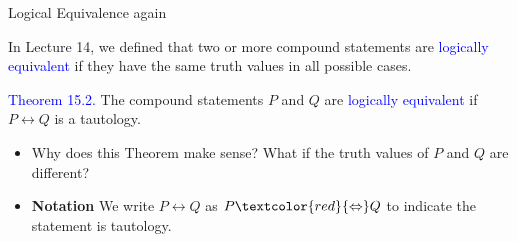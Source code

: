 \documentclass[aspectratio=169]{beamer}
\providecommand{\Blue}[1]{\textcolor{blue}{#1}}
\providecommand{\Red}[1]{\textcolor{red}{#1}}
\begin{document}
\begin{frame}[plain]{Logical Equivalence again}

In Lecture 14, we defined that two or more compound statements are  \Blue{logically equivalent}
if they have the same truth values in all possible cases.
\medskip

\Blue{Theorem 15.2.} The compound statements $P$ and $Q$ are  \Blue{logically equivalent} if
    $P \leftrightarrow Q$ is a tautology. 
    \begin{itemize}
      \item Why does this Theorem make sense? What if the truth values of $P$ and $Q$ are different?
      \pause 
      \item {\bf Notation} We write $P \leftrightarrow Q$ as $P \Red{\Leftrightarrow} Q$ to
         indicate the statement is tautology.
    \end{itemize}

 \vspace{.5in}
 

\end{frame}
\end{document}
